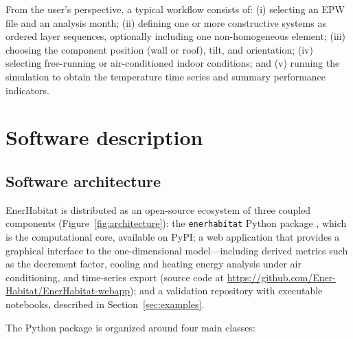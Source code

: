 \documentclass[preprint,12pt, a4paper]{elsarticle}
\begin{document}
From the user's perspective, a typical workflow consists of: (i) selecting an EPW file and an analysis month; (ii) defining one or more constructive systems as ordered layer sequences, optionally including one non-homogeneous element; (iii) choosing the component position (wall or roof), tilt, and orientation; (iv) selecting free-running or air-conditioned indoor conditions; and (v) running the simulation to obtain the temperature time series and summary performance indicators.


\section{Software description}

\subsection{Software architecture}

EnerHabitat is distributed as an open-source ecosystem of three coupled components (Figure~\ref{fig:architecture}): the \texttt{enerhabitat} Python package \cite{enerhabitat_v021}, which is the computational core, available on PyPI; a web application that provides a graphical interface to the one-dimensional model---including derived metrics such as the decrement factor, cooling and heating energy analysis under air conditioning, and time-series export (source code at \url{https://github.com/Ener-Habitat/EnerHabitat-webapp}); and a validation repository with executable notebooks, described in Section~\ref{sec:examples}.

The Python package is organized around four main classes:
\end{document}

